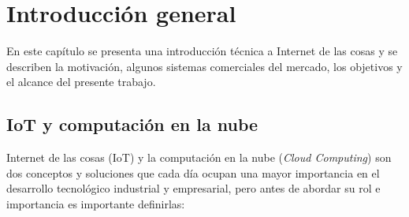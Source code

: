 
\chapter{Introducción general} %

\label{Chapter1} %
\label{IntroGeneral}
En este capítulo se presenta una introducción técnica a Internet de las cosas y se describen la motivación, algunos sistemas comerciales del mercado, los objetivos y el alcance del presente trabajo.

\newcommand{\keyword}[1]{\textbf{#1}}
\newcommand{\tabhead}[1]{\textbf{#1}}
\newcommand{\code}[1]{\texttt{#1}}
\newcommand{\file}[1]{\texttt{\bfseries#1}}
\newcommand{\option}[1]{\texttt{\itshape#1}}
\newcommand{\grados}{$^{\circ}$}






\section{IoT y computación en la nube}

Internet de las cosas (IoT) y la computación en la nube (\emph{Cloud Computing}) son dos conceptos y soluciones que cada día ocupan una mayor importancia en el desarrollo tecnológico industrial y empresarial, pero antes de abordar su rol e importancia es importante definirlas:



